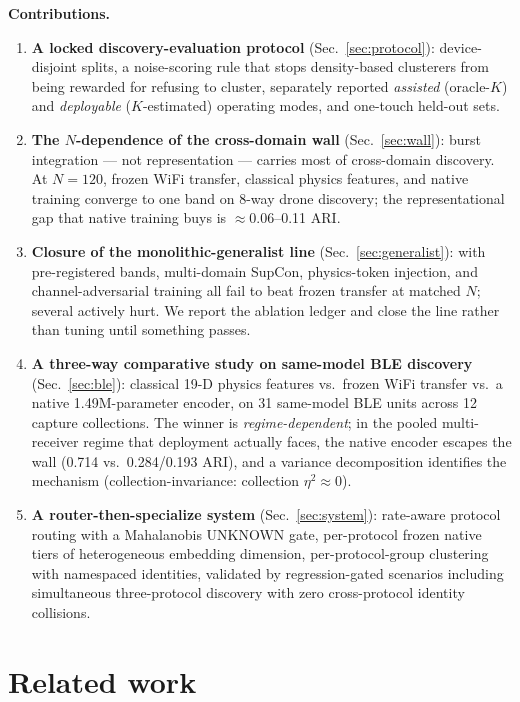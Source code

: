 \documentclass[conference]{IEEEtran}
\begin{document}
\textbf{Contributions.}
\begin{enumerate}
  \item \textbf{A locked discovery-evaluation protocol} (Sec.~\ref{sec:protocol}): device-disjoint
  splits, a noise-scoring rule that stops density-based clusterers from being rewarded for
  refusing to cluster, separately reported \emph{assisted} (oracle-$K$) and \emph{deployable}
  ($K$-estimated) operating modes, and one-touch held-out sets.
  \item \textbf{The $N$-dependence of the cross-domain wall} (Sec.~\ref{sec:wall}): burst
  integration --- not representation --- carries most of cross-domain discovery. At $N{=}120$,
  frozen WiFi transfer, classical physics features, and native training converge to one band on
  8-way drone discovery; the representational gap that native training buys is
  $\approx$0.06--0.11 ARI.
  \item \textbf{Closure of the monolithic-generalist line} (Sec.~\ref{sec:generalist}): with
  pre-registered bands, multi-domain SupCon, physics-token injection, and channel-adversarial
  training all fail to beat frozen transfer at matched $N$; several actively hurt. We report the
  ablation ledger and close the line rather than tuning until something passes.
  \item \textbf{A three-way comparative study on same-model BLE discovery}
  (Sec.~\ref{sec:ble}): classical 19-D physics features vs.\ frozen WiFi transfer vs.\ a native
  1.49M-parameter encoder, on 31 same-model BLE units across 12 capture collections. The winner is
  \emph{regime-dependent}; in the pooled multi-receiver regime that deployment actually faces, the
  native encoder escapes the wall (0.714 vs.\ 0.284/0.193 ARI), and a variance decomposition
  identifies the mechanism (collection-invariance: collection $\eta^2\!\approx\!0$).
  \item \textbf{A router-then-specialize system} (Sec.~\ref{sec:system}): rate-aware protocol
  routing with a Mahalanobis UNKNOWN gate, per-protocol frozen native tiers of heterogeneous
  embedding dimension, per-protocol-group clustering with namespaced identities, validated by
  regression-gated scenarios including simultaneous three-protocol discovery with zero
  cross-protocol identity collisions.
\end{enumerate}

\section{Related work}
\label{sec:related}
\end{document}
